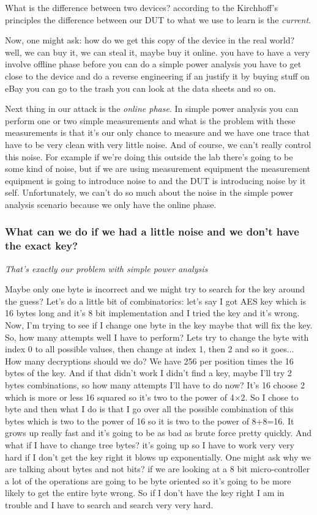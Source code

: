   What is the difference between two devices? according to the Kirchhoff’s principles the difference between our DUT to what we use to learn is the \textit{current}. 
  
Now, one might ask: how do we get this copy of the device in the real world? well, we can buy it, we can steal it, maybe buy it online. you have to have a very involve offline phase before you can do a simple power analysis you have to get close to the device and do a reverse engineering if an justify it by buying stuff on eBay you can go to the trash you can look at the data sheets and so on.

Next thing in our attack is the \textit{online phase}.
In simple power analysis you can perform one or two simple measurements and what is the problem with these measurements  is that it's our only chance to measure and we have one trace that have to be very clean with very little noise. And of course, we can’t really control this noise. For example if we’re doing this outside the lab there’s going to be some kind of noise, but if we are using measurement equipment the measurement equipment is going to introduce noise to and the DUT is introducing noise by it self. Unfortunately, we can’t do so much about the noise in the simple power analysis scenario because we only have the online phase.

\subsubsection{What can we do if we had a little noise and we don't have the exact key?}
\textit{That's exactly our problem with simple power analysis}


Maybe only one byte is incorrect and we might try to search for the key around the guess? Let’s do a little bit of combinatorics: let’s say I got AES key which is 16 bytes long and it’s 8 bit implementation and I tried the key and it's wrong. 
Now, I’m trying to see if I change one byte in the key maybe that will fix the key. So, how many attempts well I have to perform? Lets try to change the byte with index 0 to all possible values, then change at index 1, then 2 and so it goes... 
How many decryptions should we do? We have 256 per position times the 16 bytes of the key. 
And if that didn’t work I didn’t find a key, maybe I’ll try 2 bytes combinations, so how many attempts I’ll have to do now? It’s 16 choose 2 which is more or less 16 squared so it’s two to the power of 4×2. So I chose to byte and then what I do is that I go over all the possible combination of this bytes which is two to the power of 16 so it is two to the power of 8+8=16. It grows up really fast and it’s going to be as bad as brute force pretty quickly. And what if I have to change tree bytes? it’s going up so I have to work very very hard if I don’t get the key right it blows up exponentially.
One might ask why we are talking about bytes and not bits? if we are looking at a 8 bit micro-controller a lot of the operations are going to be byte oriented so it’s going to be more likely to get the entire byte wrong. So if I don’t have the key right I am in trouble and I have to search and search very very hard. 

